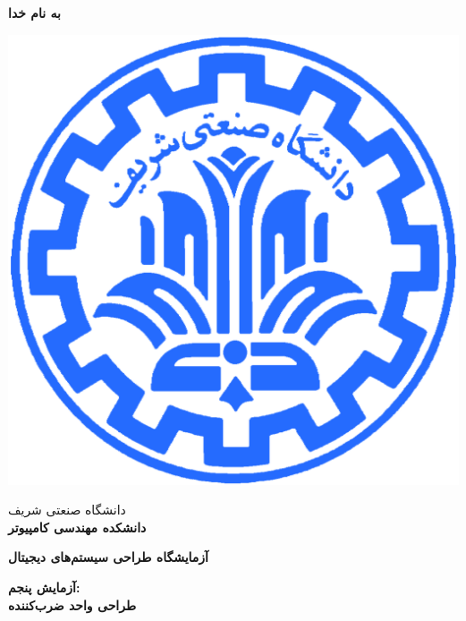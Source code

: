 \documentclass[12pt,onecolumn,a4paper,fleqn]{article}
\begin{document}
	\large
	\begin{titlepage}
		
		\begin{center}
			\begin{huge}
				\textbf{
					به نام خدا\\
				}
			\end{huge}
			
			\vspace*{1.5cm}
			\includegraphics[scale=0.9]{source/sharif_logo.png}\\
			\vspace*{0.5cm}
			\begin{Large}
				
				دانشگاه صنعتی شریف\\
				\vspace*{0.25cm}
				\textbf{
					دانشکده مهندسی کامپیوتر\\
				}
			\end{Large}
			\vspace*{3cm}
			\begin{huge}
				\textbf{
					آزمایشگاه طراحی سیستم‌های دیجیتال\\
					\vspace*{1.75cm}
				}
			\end{huge}
			
			\begin{Large}
				\textbf{
					آزمایش پنجم:\\
					طراحی واحد ضرب‌کننده\\
				}
			\end{Large}
			

\end{center}
\end{titlepage}
\end{document}
